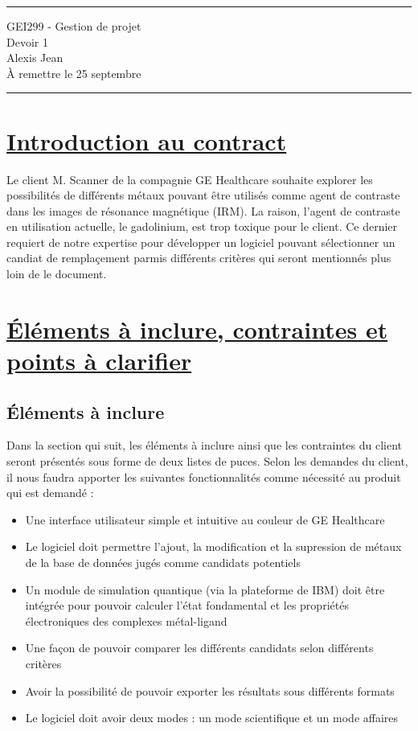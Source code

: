 \documentclass[11pt]{article}
\begin{document}
\hrule

\begin{center}
  {\Large GEI299 - Gestion de projet} \\ \vspace{5mm}
  {\LARGE\sffamily Devoir 1} \\
  Alexis Jean \\
  À remettre le 25 septembre
\end{center}

\hrule


\section{\underline{Introduction au contract}}
Le client M. Scanner de la compagnie GE Healthcare souhaite explorer les possibilités de différents métaux pouvant être utilisés comme agent de contraste dans les images de résonance magnétique (IRM). La raison, l'agent de contraste en utilisation actuelle, le gadolinium, est trop toxique pour le client. Ce dernier requiert de notre expertise pour développer un logiciel pouvant sélectionner un candiat de remplaçement parmis différents critères qui seront mentionnés plus loin de le document.


\section{\underline{Éléments à inclure, contraintes et points à clarifier}}

\subsection{Éléments à inclure}
Dans la section qui suit, les éléments à inclure ainsi que les contraintes du client seront présentés sous forme de deux listes de puces. Selon les demandes du client, il nous faudra apporter les suivantes fonctionnalités comme nécessité au produit qui est demandé :

\begin{itemize}[label=\textbullet]
  \item Une interface utilisateur simple et intuitive au couleur de GE Healthcare
  \item Le logiciel doit permettre l'ajout, la modification et la supression de métaux de la base de données jugés comme candidats potentiels
  \item Un module de simulation quantique (via la plateforme de IBM) doit être intégrée pour pouvoir calculer l’état fondamental et les propriétés électroniques des complexes métal-ligand
  \item Une façon de pouvoir comparer les différents candidats selon différents critères
  \item Avoir la possibilité de pouvoir exporter les résultats sous différents formats
  \item Le logiciel doit avoir deux modes : un mode scientifique et un mode affaires
\end{itemize}
\end{document}
